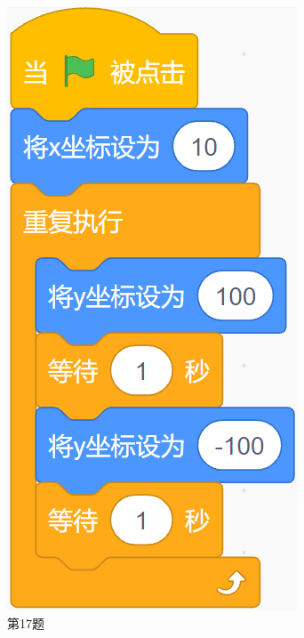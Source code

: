 \documentclass[10pt, a4paper]{article}
\begin{document}
\begin{enumerate}
\begin{figure}[htbp]
\begin{minipage}[t]{.13\textwidth}
                \includegraphics[width=\textwidth]{17.png}
                \caption*{第17题}
            \end{minipage}
        \end{figure}


\end{enumerate}
\end{document}
